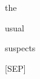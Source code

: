 \documentclass[varwidth=150mm]{standalone}
\begin{document}
\begin{CJK*}{UTF8}{gbsn}
{{{\colorbox{red!0.0}{\strut the} \colorbox{red!2.242460250854492}{\strut usual} \colorbox{red!41.446712493896484}{\strut suspects} \colorbox{red!7.2214436531066895}{\strut [SEP]}
}}}
\end{CJK*}
\end{document}
